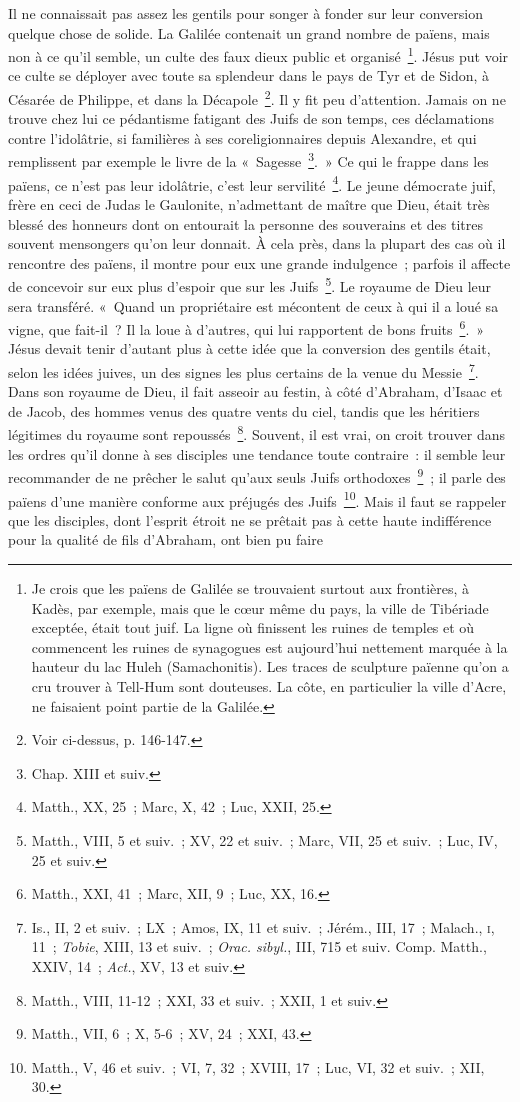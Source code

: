 \documentclass[french,twoside]{book} %
\begin{document}
Il ne connaissait pas assez les gentils pour songer à fonder sur leur conversion quelque chose de solide. La Galilée contenait un grand nombre de païens, mais non à ce qu’il semble, un culte des faux dieux public et organisé \footnote{Je crois que les païens de Galilée se trouvaient surtout aux frontières, à Kadès, par exemple, mais que le cœur même du pays, la ville de Tibériade exceptée, était tout juif. La ligne où finissent les ruines de temples et où commencent les ruines de synagogues est aujourd’hui nettement marquée à la hauteur du lac Huleh (Samachonitis). Les traces de sculpture païenne qu’on a cru trouver à Tell-Hum sont douteuses. La côte, en particulier la ville d’Acre, ne faisaient point partie de la Galilée.}. Jésus put voir ce culte se déployer avec toute sa splendeur dans le pays de Tyr et de Sidon, à Césarée de Philippe, et dans la Décapole \footnote{Voir ci-dessus, p. 146-147.}. Il y fit peu d’attention. Jamais on ne trouve chez lui ce pédantisme fatigant des Juifs de son temps, ces déclamations contre l’idolâtrie, si familières à ses coreligionnaires depuis Alexandre, et qui remplissent par exemple le livre de la « Sagesse \footnote{Chap. XIII et suiv.}. » Ce qui le frappe dans les païens, ce n’est pas leur idolâtrie, c’est leur servilité \footnote{Matth., XX, 25 ; Marc, X, 42 ; Luc, XXII, 25.}. Le jeune démocrate juif, frère en ceci de Judas le Gaulonite, n’admettant de maître que Dieu, était très blessé des honneurs dont on entourait la personne des souverains et des titres souvent mensongers qu’on leur donnait. À cela près, dans la plupart des cas où il rencontre des païens, il montre pour eux une grande indulgence ; parfois il affecte de concevoir sur eux plus d’espoir que sur les Juifs \footnote{Matth., VIII, 5 et suiv. ; XV, 22 et suiv. ; Marc, VII, 25 et suiv. ; Luc, IV, 25 et suiv.}. Le royaume de Dieu leur sera transféré. « Quand un propriétaire est mécontent de ceux à qui il a loué sa vigne, que fait-il ? Il la loue à d’autres, qui lui rapportent de bons fruits \footnote{Matth., XXI, 41 ; Marc, XII, 9 ; Luc, XX, 16.}. » Jésus devait tenir d’autant plus à cette idée que la conversion des gentils était, selon les idées juives, un des signes les plus certains de la venue du Messie \footnote{ Is., II, 2 et suiv. ; LX ; Amos, IX, 11 et suiv. ; Jérém., III, 17 ; Malach., \textsc{i}, 11 ; {\itshape Tobie}, XIII, 13 et suiv. ; {\itshape Orac. sibyl.}, III, 715 et suiv. Comp. Matth., XXIV, 14 ; {\itshape Act.}, XV, 13 et suiv.}. Dans son royaume de Dieu, il fait asseoir au festin, à côté d’Abraham, d’Isaac et de Jacob, des hommes venus des quatre vents du ciel, tandis que les héritiers légitimes du royaume sont repoussés \footnote{Matth., VIII, 11-12 ; XXI, 33 et suiv. ; XXII, 1 et suiv.}. Souvent, il est vrai, on croit trouver dans les ordres qu’il donne à ses disciples une tendance toute contraire : il semble leur recommander de ne prêcher le salut qu’aux seuls Juifs orthodoxes \footnote{Matth., VII, 6 ; X, 5-6 ; XV, 24 ; XXI, 43.} ; il parle des païens d’une manière conforme aux préjugés des Juifs \footnote{Matth., V, 46 et suiv. ; VI, 7, 32 ; XVIII, 17 ; Luc, VI, 32 et suiv. ; XII, 30.}. Mais il faut se rappeler que les disciples, dont l’esprit étroit ne se prêtait pas à cette haute indifférence pour la qualité de fils d’Abraham, ont bien pu faire 
\end{document}
